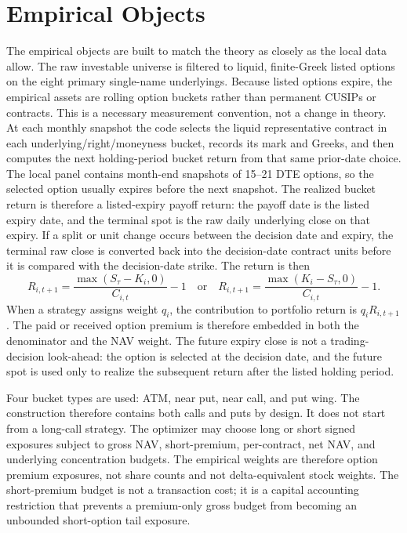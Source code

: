 \section{Empirical Objects}

The empirical objects are built to match the theory as closely as the local data allow.
The raw investable universe is filtered to liquid, finite-Greek listed options on the
eight primary single-name underlyings. Because listed options expire, the empirical assets
are rolling option buckets rather than permanent CUSIPs or contracts. This is a necessary
measurement convention, not a change in theory. At each monthly snapshot the code selects
the liquid representative contract in each underlying/right/moneyness bucket, records its
mark and Greeks, and then computes the next holding-period bucket return from that
same prior-date choice. The local panel contains month-end snapshots of 15--21 DTE
options, so the selected option usually expires before the next snapshot. The realized
bucket return is therefore a listed-expiry payoff return: the payoff date is the listed
expiry date, and the terminal spot is the raw daily underlying close on that expiry. If a
split or unit change occurs between the decision date and expiry, the terminal raw close
is converted back into the decision-date contract units before it is compared with the
decision-date strike. The return is then
\[
  R_{i,t+1}=\frac{\max(S_{\tau}-K_i,0)}{C_{i,t}}-1
  \quad\text{or}\quad
  R_{i,t+1}=\frac{\max(K_i-S_{\tau},0)}{C_{i,t}}-1 .
\]
When a strategy assigns weight \(q_i\), the contribution to portfolio return is
\(q_iR_{i,t+1}\). The paid or received option premium is therefore embedded in both the
denominator and the NAV weight. The future expiry close is not a trading-decision
look-ahead: the option is selected at the decision date, and the future spot is used only
to realize the subsequent return after the listed holding period.

Four bucket types are used: ATM, near put, near call, and put wing. The construction
therefore contains both calls and puts by design. It does not start from a long-call
strategy. The optimizer may choose long or short signed exposures subject to gross NAV,
short-premium, per-contract, net NAV, and underlying concentration budgets. The empirical
weights are therefore option premium exposures, not share counts and not delta-equivalent
stock weights. The short-premium budget is not a transaction cost; it is a capital
accounting restriction that prevents a premium-only gross budget from becoming an
unbounded short-option tail exposure.

